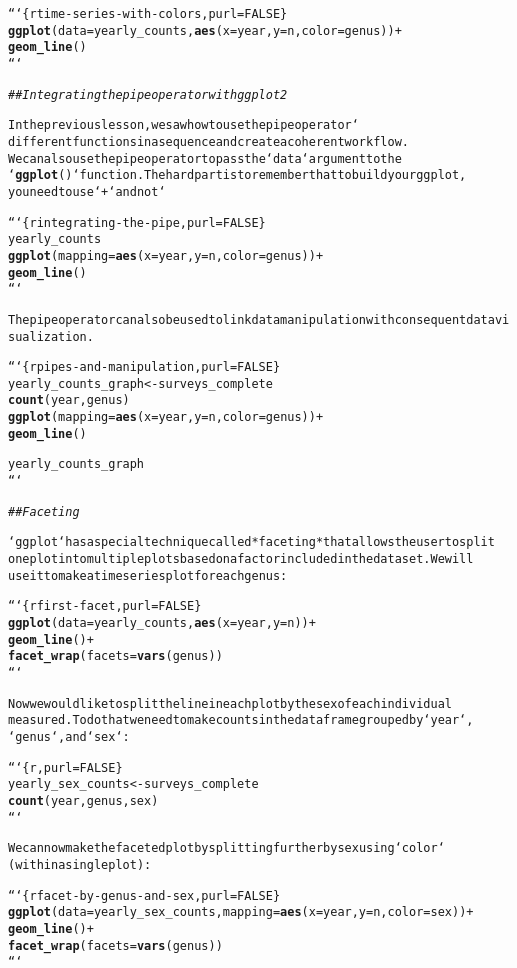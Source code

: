 \documentclass{article}\usepackage[]{graphicx}\usepackage[]{xcolor}
\makeatletter
\newcommand{\hlcom}[1]{\textcolor[rgb]{0.678,0.584,0.686}{\textit{#1}}}%
\newcommand{\hlkwd}[1]{\textcolor[rgb]{0.737,0.353,0.396}{\textbf{#1}}}%
\newenvironment{kframe}{%
 \def\at@end@of@kframe{}%
 \ifinner\ifhmode%
  \def\at@end@of@kframe{\end{minipage}}%
  \begin{minipage}{\columnwidth}%
 \fi\fi%
 \def\FrameCommand##1{\hskip\@totalleftmargin \hskip-\fboxsep
 \colorbox{shadecolor}{##1}\hskip-\fboxsep
     \hskip-\linewidth \hskip-\@totalleftmargin \hskip\columnwidth}%
 \MakeFramed {\advance\hsize-\width
   \@totalleftmargin\z@ \linewidth\hsize
   \@setminipage}}%
 {\par\unskip\endMakeFramed%
 \at@end@of@kframe}
\newenvironment{knitrout}{}{} %
\makeatother
\begin{document}
\begin{knitrout}
\begin{kframe}
\begin{alltt}
```\{r time-series-with-colors, purl = FALSE\}
\hlkwd{ggplot}(data = yearly_counts, \hlkwd{aes}(x = year, y = n, color = genus)) +
    \hlkwd{geom_line}()
```


\hlcom{## Integrating the pipe operator with ggplot2}

In the previous lesson, we saw how to use the pipe operator `%>%` to use
different functions in a sequence and create a coherent workflow.
We can also use the pipe operator to pass the `data` argument to the
`\hlkwd{ggplot}()` function. The hard part is to remember that to build your ggplot,
you need to use `+` and not `%>%`.

```\{r integrating-the-pipe, purl=FALSE\}
yearly_counts %>%
    \hlkwd{ggplot}(mapping = \hlkwd{aes}(x = year, y = n, color = genus)) +
    \hlkwd{geom_line}()
```

The pipe operator can also be used to link data manipulation with consequent data visualization.

```\{r pipes-and-manipulation, purl=FALSE\}
yearly_counts_graph <- surveys_complete %>%
    \hlkwd{count}(year, genus) %>%
    \hlkwd{ggplot}(mapping = \hlkwd{aes}(x = year, y = n, color = genus)) +
    \hlkwd{geom_line}()

yearly_counts_graph
```


\hlcom{## Faceting}

`ggplot` has a special technique called *faceting* that allows the user to split
one plot into multiple plots based on a factor included in the dataset. We will
use it to make a time series plot for each genus:

```\{r first-facet, purl = FALSE\}
\hlkwd{ggplot}(data = yearly_counts, \hlkwd{aes}(x = year, y = n)) +
    \hlkwd{geom_line}() +
    \hlkwd{facet_wrap}(facets = \hlkwd{vars}(genus))
```

Now we would like to split the line in each plot by the sex of each individual
measured. To do that we need to make counts in the data frame grouped by `year`,
`genus`, and `sex`:

```\{r, purl = FALSE\}
 yearly_sex_counts <- surveys_complete %>%
                      \hlkwd{count}(year, genus, sex)
```

We can now make the faceted plot by splitting further by sex using `color`
(within a single plot):

```\{r facet-by-genus-and-sex, purl=FALSE\}
\hlkwd{ggplot}(data = yearly_sex_counts, mapping = \hlkwd{aes}(x = year, y = n, color = sex)) +
  \hlkwd{geom_line}() +
  \hlkwd{facet_wrap}(facets =  \hlkwd{vars}(genus))
```


\end{alltt}
\end{kframe}
\end{knitrout}
\end{document}
